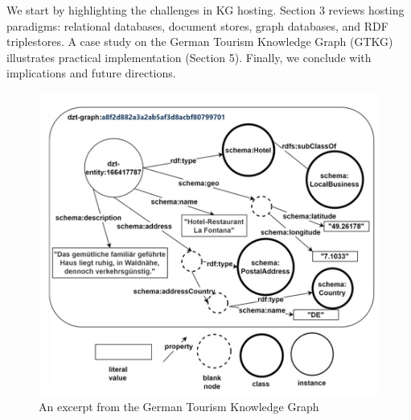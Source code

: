 \documentclass[12pt]{article}
\begin{document}
We start by highlighting the challenges in KG hosting. Section 3 reviews hosting paradigms: relational databases, document stores, graph databases, and RDF triplestores. A case study on the German Tourism Knowledge Graph (GTKG) illustrates practical implementation (Section 5). Finally, we conclude with implications and future directions.
\begin{figure}
    \includegraphics[width=\linewidth]{imgs/gtkg-example.jpeg}
    \caption{An excerpt from the German Tourism Knowledge Graph}
    \label{fig:gtkg_example}
\end{figure}
\end{document}
